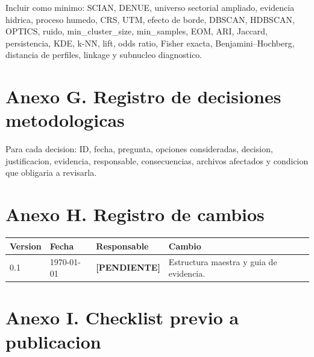 \documentclass[11pt,letterpaper]{article}
\newcommand{\pendiente}{\textcolor{AtoyacRed}{\textbf{[PENDIENTE]}}}
\begin{document}
Incluir como minimo: SCIAN, DENUE, universo sectorial ampliado, evidencia hidrica, proceso humedo, CRS, UTM, efecto de borde, DBSCAN, HDBSCAN, OPTICS, ruido, min\_cluster\_size, min\_samples, EOM, ARI, Jaccard, persistencia, KDE, k-NN, lift, odds ratio, Fisher exacta, Benjamini--Hochberg, distancia de perfiles, linkage y subnucleo diagnostico.

\section{Anexo G. Registro de decisiones metodologicas}

Para cada decision: ID, fecha, pregunta, opciones consideradas, decision, justificacion, evidencia, responsable, consecuencias, archivos afectados y condicion que obligaria a revisarla.

\section{Anexo H. Registro de cambios}

\begin{longtable}{p{}p{}p{}p{}}
\toprule
\textbf{Version} & \textbf{Fecha} & \textbf{Responsable} & \textbf{Cambio} \\
\midrule
0.1 & \today & \pendiente & Estructura maestra y guia de evidencia. \\
\bottomrule
\end{longtable}

\section{Anexo I. Checklist previo a publicacion}
\end{document}
